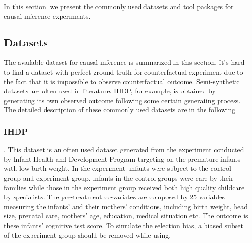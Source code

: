 In this section, we present the commonly used datasets and tool packages for causal inference experiments.

\subsection{Datasets}\label{subsec:datasets}

The available dataset for causal inference is summarized in this section.
It's hard to find a dataset with perfect ground truth for counterfactual experiment due to the fact that it is
impossible to observe counterfactual outcome.
Semi-synthetic datasets are often used in literature.
IHDP, for example, is obtained by generating its own observed outcome following some certain generating process.
The detailed description of these commonly used datasets are in the following.

\subsubsection{IHDP}.
This dataset is an often used dataset generated from the experiment conducted by Infant Health and Development
Program\cite{brooks1992effects} targeting on the premature infants with low birth-weight.
In the experiment, infants were subject to the control group and experiment group.
Infants in the control groups were care by their families while those in the experiment group received both high quality
childcare by specialists\cite{hill2011bayesian}.
The pre-treatment co-variates are composed by 25 variables measuring the infants' and their mothers' conditions,
including birth weight, head size, prenatal care, mothers' age, education, medical situation etc.
The outcome is these infants' cognitive test score.
To simulate the selection bias, a biased subset of the experiment group should be removed while using.

